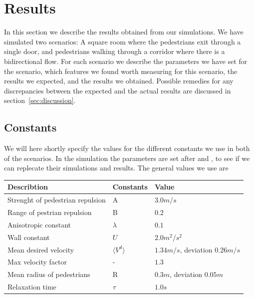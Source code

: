 \section{Results}
\label{sec:results}
In this section we describe the results obtained from our simulations. We have simulated two scenarios: A square room where the pedestrians exit through a single door, and pedestrians walking through a corridor where there is a bidirectional flow. For each scenario we describe the parameters we have set for the scenario, which features we found worth measuring for this scenario, the results we expected, and the results we obtained. Possible remedies for any discrepancies between the expected and the actual results are discussed in section~\ref{sec:discussion}.

\subsection{Constants}
We will here shortly specify the values for the different constants we use in both of the scenarios.
In the simulation the parameters are set after \cite{ABconstant} and \cite{self-org}, to see if we can replecate their simulations and results.
The general values we use are

\begin{center}
\begin{table}[ht]
\begin{center}
    \begin{tabular}{ | l | l | l |}
    \hline
       Describtion & Constants & Value \\ \hline \hline
	Strenght of pedestrian repulsion & A & $3.0m/s$ \\ \hline	
	Range of pestrian repulsion & B & $0.2$ \\ \hline
	Anisotropic constant & $\lambda$ & $0.1$ \\ \hline
	Wall constant & $U$ &  $2.0m^2/s^2$ \\ \hline
	Mean desired velocity &  $\langle V^d \rangle$ &  $1.34 m/s$, deviation $0.26 m/s$ \\ \hline
	Max velocity factor & - &  $1.3$ \\ \hline
	Mean radius of pedestrians & R & $0.3 m$, deviation $0.05 m$\\ \hline
	Relaxation time & $\tau$ & $1.0 s$\\ \hline
    \end{tabular}
\label{Table_constants}
\end{center}
\end{table}
\end{center}

